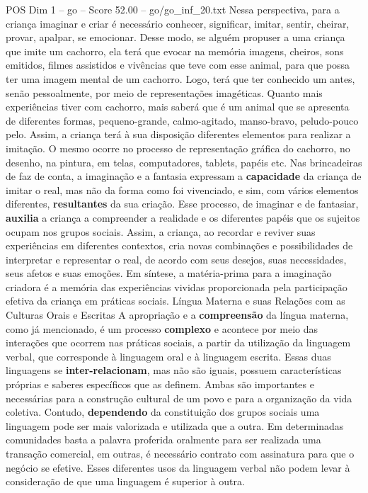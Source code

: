 \begin{textsample}{POS Dim 1 – go – Score 52.00 – go/go\_inf\_20.txt}
Nessa perspectiva, para a criança imaginar e criar é necessário conhecer, significar, imitar, sentir, cheirar, provar, apalpar, se emocionar.
Desse modo, se alguém propuser a uma criança que imite um cachorro, ela terá que evocar na memória imagens, cheiros, sons emitidos, filmes assistidos e vivências que teve com esse animal, para que possa ter uma imagem mental de um cachorro.
Logo, terá que ter conhecido um antes, senão pessoalmente, por meio de representações imagéticas.
Quanto mais experiências tiver com cachorro, mais saberá que é um animal que se apresenta de diferentes formas, pequeno-grande, calmo-agitado, manso-bravo, peludo-pouco pelo.
Assim, a criança terá à sua disposição diferentes elementos para realizar a imitação.
O mesmo ocorre no processo de representação gráfica do cachorro, no desenho, na pintura, em telas, computadores, tablets, papéis etc.
Nas brincadeiras de faz de conta, a imaginação e a fantasia expressam a \textbf{capacidade} da criança de imitar o real, mas não da forma como foi vivenciado, e sim, com vários elementos diferentes, \textbf{resultantes} da sua criação.
Esse processo, de imaginar e de fantasiar, \textbf{auxilia} a criança a compreender a realidade e os diferentes papéis que os sujeitos ocupam nos grupos sociais.
Assim, a criança, ao recordar e reviver suas experiências em diferentes contextos, cria novas combinações e possibilidades de interpretar e representar o real, de acordo com seus desejos, suas necessidades, seus afetos e suas emoções.
Em síntese, a matéria-prima para a imaginação criadora é a memória das experiências vividas proporcionada pela participação efetiva da criança em práticas sociais.
Língua Materna e suas Relações com as Culturas Orais e Escritas A apropriação e a \textbf{compreensão} da língua materna, como já mencionado, é um processo \textbf{complexo} e acontece por meio das interações que ocorrem nas práticas sociais, a partir da utilização da linguagem verbal, que corresponde à linguagem oral e à linguagem escrita.
Essas duas linguagens se \textbf{inter-relacionam}, mas não são iguais, possuem características próprias e saberes específicos que as definem.
Ambas são importantes e necessárias para a construção cultural de um povo e para a organização da vida coletiva.
Contudo, \textbf{dependendo} da constituição dos grupos sociais uma linguagem pode ser mais valorizada e utilizada que a outra.
Em determinadas comunidades basta a palavra proferida oralmente para ser realizada uma transação comercial, em outras, é necessário contrato com assinatura para que o negócio se efetive.
Esses diferentes usos da linguagem verbal não podem levar à consideração de que uma linguagem é superior à outra.

\end{textsample}
